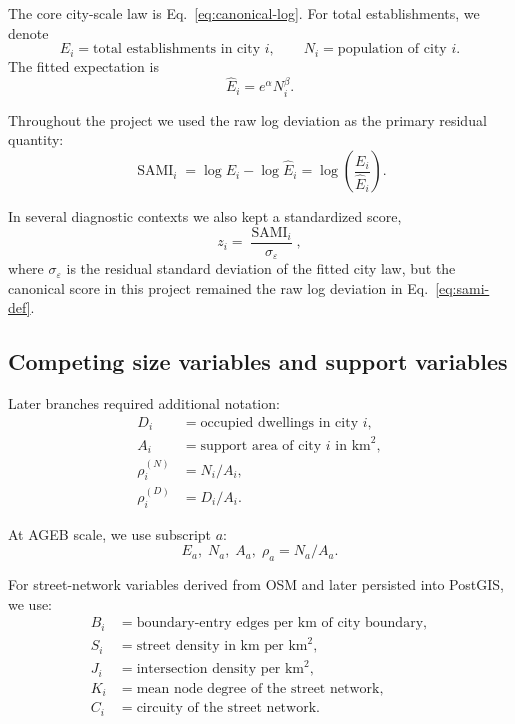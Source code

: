\documentclass[11pt]{article}
\newcommand{\SAMI}{\operatorname{SAMI}}
\begin{document}
The core city-scale law is Eq.~\eqref{eq:canonical-log}. For total establishments, we denote
\begin{equation}
E_i = \text{total establishments in city } i,
\qquad
N_i = \text{population of city } i.
\end{equation}
The fitted expectation is
\begin{equation}
\widehat{E}_i = e^\alpha N_i^\beta.
\end{equation}

Throughout the project we used the raw log deviation as the primary residual quantity:
\begin{equation}
\SAMI_i
=
\log E_i - \log \widehat{E}_i
=
\log\!\left(\frac{E_i}{\widehat{E}_i}\right).
\label{eq:sami-def}
\end{equation}

In several diagnostic contexts we also kept a standardized score,
\begin{equation}
z_i = \frac{\SAMI_i}{\sigma_\varepsilon},
\end{equation}
where \(\sigma_\varepsilon\) is the residual standard deviation of the fitted city law, but the canonical score in this project remained the raw log deviation in Eq.~\eqref{eq:sami-def}.

\subsection{Competing size variables and support variables}

Later branches required additional notation:
\begin{align}
D_i &= \text{occupied dwellings in city } i,\\
A_i &= \text{support area of city } i \text{ in km}^2,\\
\rho_i^{(N)} &= N_i/A_i,\\
\rho_i^{(D)} &= D_i/A_i.
\end{align}

At AGEB scale, we use subscript \(a\):
\begin{equation}
E_a, \; N_a, \; A_a, \; \rho_a = N_a/A_a.
\end{equation}

For street-network variables derived from OSM and later persisted into PostGIS, we use:
\begin{align}
B_i &= \text{boundary-entry edges per km of city boundary},\\
S_i &= \text{street density in km per km}^2,\\
J_i &= \text{intersection density per km}^2,\\
K_i &= \text{mean node degree of the street network},\\
C_i &= \text{circuity of the street network}.
\end{align}
\end{document}
